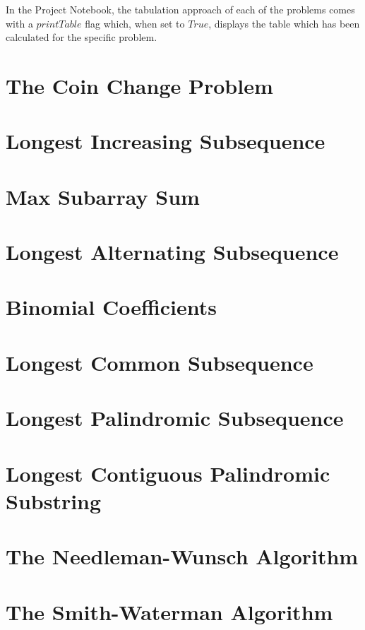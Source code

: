 In the Project Notebook, the tabulation approach of each of the problems comes with a $printTable$ flag which, when set to $True$, displays the table which has been calculated for the specific problem.

\section{The Coin Change Problem}


\section{Longest Increasing Subsequence}


\section{Max Subarray Sum}


\section{Longest Alternating Subsequence}


\section{Binomial Coefficients}


\section{Longest Common Subsequence} \label{section:lcs}


\section{Longest Palindromic Subsequence}


\section{Longest Contiguous Palindromic Substring}


\section{The Needleman-Wunsch Algorithm}


\section{The Smith-Waterman Algorithm}


